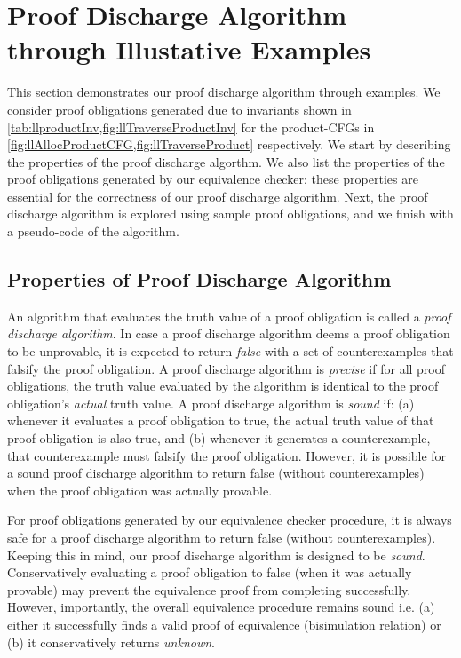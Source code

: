 \chapter{Proof Discharge Algorithm through Illustative Examples}
\label{sec:examples}
This section demonstrates our proof discharge algorithm through examples.
We consider proof obligations generated due to invariants shown in \cref{tab:llproductInv,fig:llTraverseProductInv}
for the product-CFGs in \cref{fig:llAllocProductCFG,fig:llTraverseProduct} respectively.
We start by describing the properties of the proof discharge algorthm.
We also list the properties of the proof obligations generated by our equivalence checker;
these properties are essential for the correctness of our proof discharge algorithm.
Next, the proof discharge algorithm is explored using sample proof obligations,
and we finish with a pseudo-code of the algorithm.

\section{Properties of Proof Discharge Algorithm}
\label{sec:proofalgoprops}
An algorithm that evaluates the truth value of a proof obligation is called a
{\em proof discharge algorithm}.
In case a proof discharge algorithm deems a proof obligation to be unprovable,
it is expected to return {\em false} with a set of counterexamples that falsify
the proof obligation.
A proof discharge algorithm is {\em precise} if for all proof obligations,
the truth value evaluated by the algorithm is identical to the proof obligation's
{\em actual} truth value.
A proof discharge algorithm is {\em sound} if:
(a) whenever it evaluates a proof obligation to true,
the actual truth value of that proof obligation is also true,
and (b) whenever it generates a counterexample, that counterexample
must falsify the proof obligation.
However, it is possible for a sound proof discharge algorithm to return false
(without counterexamples) when the proof obligation was actually provable.

For proof obligations generated by our equivalence checker procedure,
it is always safe for a proof discharge algorithm to return false (without counterexamples).
Keeping this in mind, our proof discharge algorithm is designed to be {\em sound}.
Conservatively evaluating a proof obligation to false (when it was actually provable)
may prevent the equivalence proof from completing successfully.
However, importantly, the overall equivalence procedure remains sound i.e.
(a) either it successfully finds a valid proof of equivalence (bisimulation relation)
or (b) it conservatively returns {\em unknown}.

